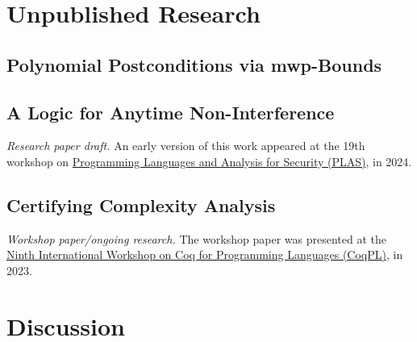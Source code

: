 \chapter{Unpublished Research}\label{ch:unpublished-research}

    \section{Polynomial Postconditions via mwp-Bounds}\label{sec:postcond}
    \pageIconFm
    \clearpage
    
    \clearpage

    \section{A Logic for Anytime Non-Interference}\label{sec:anytime}
    \pageIconSecurity
    {\emph{Research paper draft.}
    \newline\newline{}An early version of this work appeared at the 19th
    workshop on \href{https://plas24.github.io/}
    {Programming Languages and Analysis for Security (PLAS)}, in 2024.}
    \clearpage
    {}
    \clearpage

    \section{Certifying Complexity Analysis}\label{sec:mwp-calc-formal}
    \pageIconFm
    {\emph{Workshop paper/ongoing research.}
    \newline\newline{}The workshop paper was presented at
    the \href{https://popl23.sigplan.org/home/CoqPL-2023} {Ninth International
    Workshop on Coq for Programming Languages (CoqPL)}, in 2023.}
    \clearpage
    
    \clearpage

\chapter{Discussion}\label{ch:discussion}


